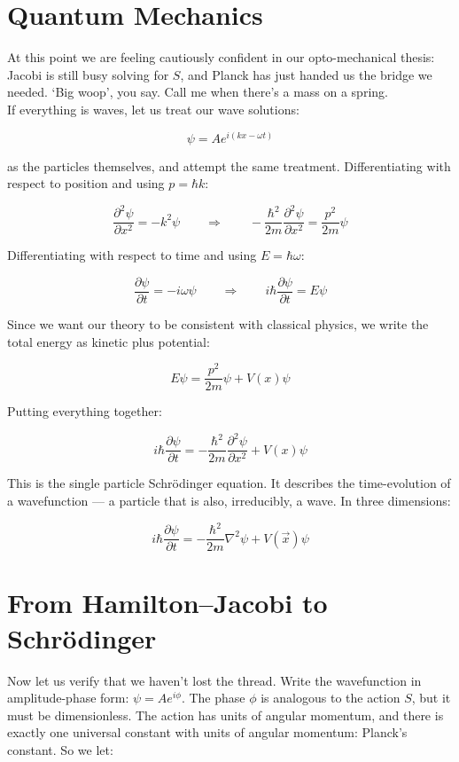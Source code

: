 \documentclass[krantz1,ChapterTOCs]{krantz}
\begin{document}
\section*{Quantum Mechanics}

At this point we are feeling cautiously confident in our 
opto-mechanical thesis: Jacobi is still busy solving for $S$, and 
Planck has just handed us the bridge we needed. `Big woop', you say. 
Call me when there's a mass on a spring.\\

If everything is waves, let us treat our wave solutions:

$$\psi = A e^{i(kx - \omega t)}$$

as the particles themselves, and attempt the same treatment. 
Differentiating with respect to position and using $p = \hbar k$:

$$\frac{\partial^2\psi}{\partial x^2} = -k^2\psi 
\qquad \Rightarrow \qquad 
-\frac{\hbar^2}{2m}\frac{\partial^2\psi}{\partial x^2} 
= \frac{p^2}{2m}\psi$$

Differentiating with respect to time and using $E = \hbar\omega$:

$$\frac{\partial\psi}{\partial t} = -i\omega\psi 
\qquad \Rightarrow \qquad 
i\hbar\frac{\partial\psi}{\partial t} = E\psi$$

Since we want our theory to be consistent with classical physics, 
we write the total energy as kinetic plus potential:

$$E\psi = \frac{p^2}{2m}\psi + V(x)\psi$$

Putting everything together:

$$\boxed{i\hbar\frac{\partial\psi}{\partial t} = 
-\frac{\hbar^2}{2m}\frac{\partial^2\psi}{\partial x^2} + V(x)\psi}$$

This is the single particle Schr\"{o}dinger equation. It describes 
the time-evolution of a wavefunction --- a particle that is also, 
irreducibly, a wave. In three dimensions:

$$\boxed{i\hbar\frac{\partial\psi}{\partial t} = 
-\frac{\hbar^2}{2m}\nabla^2\psi + V(\vec{x})\psi}$$

\section*{From Hamilton--Jacobi to Schr\"{o}dinger}

Now let us verify that we haven't lost the thread. Write the 
wavefunction in amplitude-phase form: $\psi = Ae^{i\phi}$. The 
phase $\phi$ is analogous to the action $S$, but it must be 
dimensionless. The action has units of angular momentum, and there 
is exactly one universal constant with units of angular momentum: 
Planck's constant. So we let:
\end{document}
